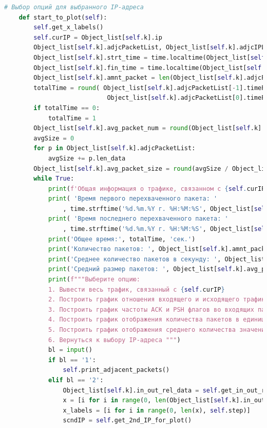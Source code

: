 \documentclass[bachelor, och, coursework]{SCWorks}
\begin{document}
\begin{lstlisting}[language=Python]
    # Выбор опций для выбранного IP-адреса
    def start_to_plot(self):
        self.get_x_labels()
        self.curIP = Object_list[self.k].ip
        Object_list[self.k].adjcPacketList, Object_list[self.k].adjcIPList = self.get_inf_about_IP()
        Object_list[self.k].strt_time = time.localtime(Object_list[self.k].adjcPacketList[0].timePacket)
        Object_list[self.k].fin_time = time.localtime(Object_list[self.k].adjcPacketList[-1].timePacket)
        Object_list[self.k].amnt_packet = len(Object_list[self.k].adjcPacketList)
        totalTime = round( Object_list[self.k].adjcPacketList[-1].timePacket - \
                            Object_list[self.k].adjcPacketList[0].timePacket )
        if totalTime == 0:
            totalTime = 1
        Object_list[self.k].avg_packet_num = round(Object_list[self.k].amnt_packet / totalTime, 3)
        avgSize = 0
        for p in Object_list[self.k].adjcPacketList:
            avgSize += p.len_data
        Object_list[self.k].avg_packet_size = round(avgSize / Object_list[self.k].amnt_packet, 3)
        while True:
            print(f'Общая информация о трафике, связанном с {self.curIP}')
            print( 'Время первого перехваченного пакета: '
                , time.strftime('%d.%m.%Y г. %H:%M:%S', Object_list[self.k].strt_time) )
            print( 'Время последнего перехваченного пакета: '
                , time.strftime('%d.%m.%Y г. %H:%M:%S', Object_list[self.k].fin_time) )
            print('Общее время:', totalTime, 'сек.')
            print('Количество пакетов: ', Object_list[self.k].amnt_packet)
            print('Среднее количество пакетов в секунду: ', Object_list[self.k].avg_packet_num)
            print('Средний размер пакетов: ', Object_list[self.k].avg_packet_size)  
            print(f"""Выберите опцию:
            1. Вывести весь трафик, связанный с {self.curIP}
            2. Построить график отношения входящего и исходящего трафиков
            3. Построить график частоты ACK и PSH флагов во входящих пакетах
            4. Построить график отображения количества пакетов в единицу времени
            5. Построить график отображения среднего количества значения размеров окна
            6. Вернуться к выбору IP-адреса """)
            bl = input()
            if bl == '1':
                self.print_adjacent_packets()
            elif bl == '2':
                Object_list[self.k].in_out_rel_data = self.get_in_out_rel(self.curIP)
                x = [i for i in range(0, len(Object_list[self.k].in_out_rel_data))]
                x_labels = [i for i in range(0, len(x), self.step)]
                scndIP = self.get_2nd_IP_for_plot()

\end{lstlisting}
\end{document}

